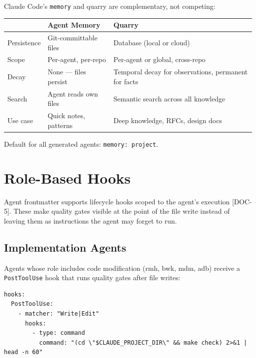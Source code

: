 \documentclass[a4paper,10pt]{article}
\newcommand{\field}[1]{\texttt{#1}}
\newcommand{\coderef}[1]{\textsf{\small [#1]}}
\begin{document}
Claude Code's \field{memory} and quarry are complementary, not
competing:

\begin{center}
\begin{tabularx}{\textwidth}{@{}lXX@{}}
\toprule
& \textbf{Agent Memory} & \textbf{Quarry} \\
\midrule
Persistence & Git-committable files & Database (local or cloud) \\
Scope & Per-agent, per-repo & Per-agent or global, cross-repo \\
Decay & None --- files persist & Temporal decay for observations,
  permanent for facts \\
Search & Agent reads own files & Semantic search across all
  knowledge \\
Use case & Quick notes, patterns & Deep knowledge, RFCs, design
  docs \\
\bottomrule
\end{tabularx}
\end{center}

Default for all generated agents: \field{memory: project}.

\section{Role-Based Hooks}
\label{sec:hooks}

Agent frontmatter supports lifecycle hooks scoped to the agent's
execution \coderef{DOC-5}. These make quality gates visible at the
point of the file write instead of leaving them as instructions the
agent may forget to run.

\subsection{Implementation Agents}

Agents whose role includes code modification (rmh, bwk, mdm, adb)
receive a \field{PostToolUse} hook that runs quality gates after
file writes:

\begin{lstlisting}[language={}]
hooks:
  PostToolUse:
    - matcher: "Write|Edit"
      hooks:
        - type: command
          command: "(cd \"$CLAUDE_PROJECT_DIR\" && make check) 2>&1 | head -n 60"
\end{lstlisting}
\end{document}
